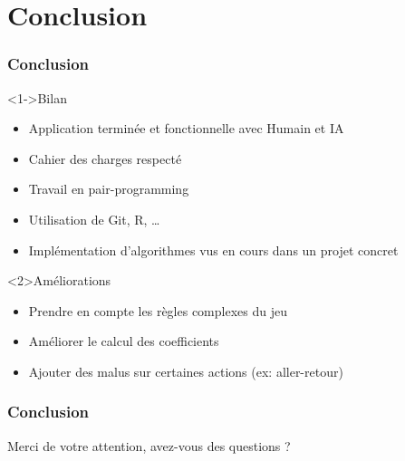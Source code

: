 \section{Conclusion}
	\begin{frame}
		\frametitle{Conclusion}
		\begin{block}<1->{Bilan}
			\begin{itemize}
				\item Application terminée et fonctionnelle avec Humain et IA
				\item Cahier des charges respecté
				\item Travail en pair-programming
				\item Utilisation de Git, R, \dots
				\item Implémentation d'algorithmes vus en cours dans un projet concret
			\end{itemize}
		\end{block}	
		\begin{exampleblock}<2>{Améliorations}
			\begin{itemize}
				\item Prendre en compte les règles complexes du jeu
				\item Améliorer le calcul des coefficients
				\item Ajouter des malus sur certaines actions (ex: aller-retour)
			\end{itemize}
		\end{exampleblock}	
\end{frame}

\begin{frame}
\frametitle{Conclusion}
\centering
{\Large Merci de votre attention, avez-vous des questions ?}

\end{frame}